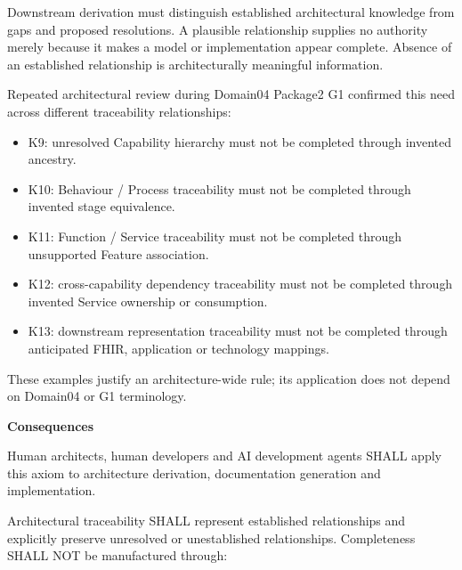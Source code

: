 Downstream derivation must distinguish established architectural knowledge
from gaps and proposed resolutions. A plausible relationship supplies no
authority merely because it makes a model or implementation appear
complete. Absence of an established relationship is architecturally
meaningful information.



Repeated architectural review during Domain04 Package2 G1 confirmed this
need across different traceability relationships:



\begin{itemize}


\item K9: unresolved Capability hierarchy must not be completed through
  invented ancestry.

\item K10: Behaviour / Process traceability must not be completed through
  invented stage equivalence.

\item K11: Function / Service traceability must not be completed through
  unsupported Feature association.

\item K12: cross-capability dependency traceability must not be completed
  through invented Service ownership or consumption.

\item K13: downstream representation traceability must not be completed through
  anticipated FHIR, application or technology mappings.

\end{itemize}


These examples justify an architecture-wide rule; its application does
not depend on Domain04 or G1 terminology.



\par\medskip\textbf{Consequences}\par


Human architects, human developers and AI development agents SHALL apply
this axiom to architecture derivation, documentation generation and
implementation.



Architectural traceability SHALL represent established relationships and
explicitly preserve unresolved or unestablished relationships.
Completeness SHALL NOT be manufactured through:



